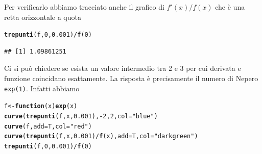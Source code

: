 \documentclass[onecolumn,11pt]{book}\usepackage[]{graphicx}\usepackage[]{color}
\makeatletter
\newcommand{\hlnum}[1]{\textcolor[rgb]{0.686,0.059,0.569}{#1}}%
\newcommand{\hlstr}[1]{\textcolor[rgb]{0.192,0.494,0.8}{#1}}%
\newcommand{\hlopt}[1]{\textcolor[rgb]{0,0,0}{#1}}%
\newcommand{\hlstd}[1]{\textcolor[rgb]{0.345,0.345,0.345}{#1}}%
\newcommand{\hlkwa}[1]{\textcolor[rgb]{0.161,0.373,0.58}{\textbf{#1}}}%
\newcommand{\hlkwb}[1]{\textcolor[rgb]{0.69,0.353,0.396}{#1}}%
\newcommand{\hlkwc}[1]{\textcolor[rgb]{0.333,0.667,0.333}{#1}}%
\newcommand{\hlkwd}[1]{\textcolor[rgb]{0.737,0.353,0.396}{\textbf{#1}}}%
\newenvironment{kframe}{%
 \def\at@end@of@kframe{}%
 \ifinner\ifhmode%
  \def\at@end@of@kframe{\end{minipage}}%
  \begin{minipage}{\columnwidth}%
 \fi\fi%
 \def\FrameCommand##1{\hskip\@totalleftmargin \hskip-\fboxsep
 \colorbox{shadecolor}{##1}\hskip-\fboxsep
     \hskip-\linewidth \hskip-\@totalleftmargin \hskip\columnwidth}%
 \MakeFramed {\advance\hsize-\width
   \@totalleftmargin\z@ \linewidth\hsize
   \@setminipage}}%
 {\par\unskip\endMakeFramed%
 \at@end@of@kframe}
\newenvironment{knitrout}{}{} %
\makeatother
\begin{document}
Per verificarlo abbiamo tracciato anche il grafico di $f'(x)/f(x)$ che \`e una retta orizzontale a quota
\begin{knitrout}
\color{fgcolor}\begin{kframe}
\begin{alltt}
\hlkwd{trepunti}\hlstd{(f,}\hlnum{0}\hlstd{,}\hlnum{0.001}\hlstd{)}\hlopt{/}\hlkwd{f}\hlstd{(}\hlnum{0}\hlstd{)}
\end{alltt}
\begin{verbatim}
## [1] 1.09861251
\end{verbatim}
\end{kframe}
\end{knitrout}

Ci si pu\`o chiedere se esista un valore intermedio tra 2 e 3 per cui derivata e funzione coincidano esattamente. La risposta \`e precisamente il numero di Nepero \texttt{exp(1)}. Infatti abbiamo
\begin{knitrout}
\color{fgcolor}\begin{kframe}
\begin{alltt}
 \hlstd{f}\hlkwb{<-}\hlkwa{function}\hlstd{(}\hlkwc{x}\hlstd{)} \hlkwd{exp}\hlstd{(x)}
 \hlkwd{curve}\hlstd{(}\hlkwd{trepunti}\hlstd{(f,x,}\hlnum{0.001}\hlstd{),}\hlopt{-}\hlnum{2}\hlstd{,}\hlnum{2}\hlstd{,} \hlkwc{col}\hlstd{=}\hlstr{"blue"}\hlstd{)}
 \hlkwd{curve}\hlstd{(f,}\hlkwc{add}\hlstd{=T,}\hlkwc{col}\hlstd{=}\hlstr{"red"}\hlstd{)}
 \hlkwd{curve}\hlstd{(}\hlkwd{trepunti}\hlstd{(f,x,}\hlnum{0.001}\hlstd{)}\hlopt{/}\hlkwd{f}\hlstd{(x),}\hlkwc{add}\hlstd{=T,} \hlkwc{col}\hlstd{=}\hlstr{"dark green"}\hlstd{)}
 \hlkwd{trepunti}\hlstd{(f,}\hlnum{0}\hlstd{,}\hlnum{0.001}\hlstd{)}\hlopt{/}\hlkwd{f}\hlstd{(}\hlnum{0}\hlstd{)}
\end{alltt}
\end{kframe}
\end{knitrout}
\end{document}
